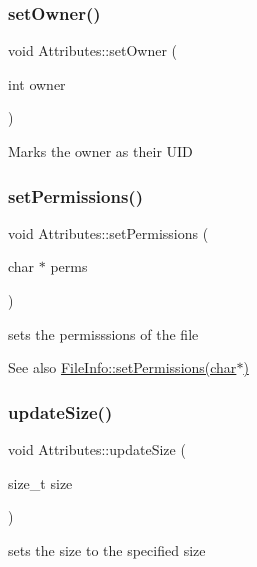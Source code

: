 \subsubsection{\texorpdfstring{set\+Owner()}{setOwner()}}
{\footnotesize\ttfamily void Attributes\+::set\+Owner (\begin{DoxyParamCaption}\item[{int}]{owner }\end{DoxyParamCaption})}

Marks the owner as their U\+ID \mbox{\label{classAttributes_a15a4348203635ff53a6cd8c2d52c68e3}} 
\subsubsection{\texorpdfstring{set\+Permissions()}{setPermissions()}}
{\footnotesize\ttfamily void Attributes\+::set\+Permissions (\begin{DoxyParamCaption}\item[{char $\ast$}]{perms }\end{DoxyParamCaption})}

sets the permisssions of the file \begin{DoxySeeAlso}{See also}
\mbox{\hyperlink{classFileInfo_ab2b69861ecef1b8e0f465906c8eaa7a7}{File\+Info\+::set\+Permissions(char$\ast$)}} 
\end{DoxySeeAlso}
\mbox{\label{classAttributes_a6ed2adf53cd6131c2b22a2782cd0bdcf}} 
\subsubsection{\texorpdfstring{update\+Size()}{updateSize()}}
{\footnotesize\ttfamily void Attributes\+::update\+Size (\begin{DoxyParamCaption}\item[{size\+\_\+t}]{size }\end{DoxyParamCaption})}

sets the size to the specified size \mbox{\label{classAttributes_a7eea700dd80e77a74afdc3c091a178b8}} 
